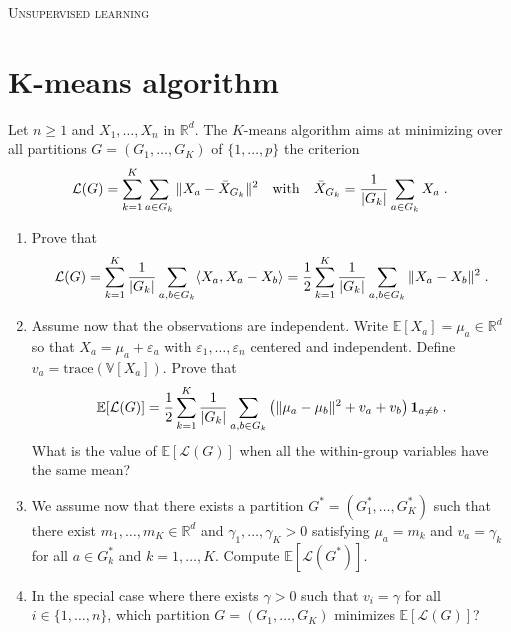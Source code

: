 \documentclass[a4paper,10pt,fleqn]{article}
\newcommand{\R}{\ensuremath{\mathbb{R}}}
\newcommand{\E}{\ensuremath{\mathbb{E}}}
\newcommand{\V}{\ensuremath{\mathbb{V}}}
\newcommand{\1}{\ensuremath{\mathbbm{1}}}
\newcommand{\eps}{\varepsilon}
\newcommand{\crit}{\mathcal{L}}
\begin{document}
\noindent\hrulefill

\begin{center}
\textsc{Unsupervised learning}
\end{center}
\hrulefill

\medskip


\section{K-means algorithm}
Let $n\geqslant 1$ and  $X_{1},\ldots,X_{n}$ in $\R^d$.
The $K$-means algorithm aims at minimizing over all partitions $G=(G_{1},\ldots,G_{K})$ of $\{1,\ldots,p\}$ the criterion
$$
\crit(G)=\sum_{k=1}^K\sum_{a\in G_{k}}\|X_{a}-\bar{X}_{G_{k}}\|^2\quad \textrm{with}\quad \bar{X}_{G_{k}}={1\over |G_{k}|}\sum_{a\in G_{k}} X_{a}\;.
$$
\begin{enumerate}
\item Prove that
$$
\crit(G)=\sum_{k=1}^K{1\over |G_{k}|}\sum_{a,b\in G_{k}} \langle X_{a},X_{a}-X_{b}\rangle ={1\over 2}\sum_{k=1}^K{1\over |G_{k}|}\sum_{a,b\in G_{k}} \|X_{a}-X_{b}\|^2\;.
$$
\item Assume now that the observations are independent. Write $\E[X_a] = \mu_{a}\in\R^d$ so that $X_{a}=\mu_{a}+\eps_{a}$ with $\eps_{1},\ldots,\eps_{n}$ centered and independent. Define $v_{a}=\textrm{trace}(\V[X_{a}])$. Prove that
$$
\E[\crit(G)]={1\over 2}\sum_{k=1}^K{1\over |G_{k}|}\sum_{a,b\in G_{k}} \left(\|\mu_{a}-\mu_{b}\|^2+v_{a}+v_{b}\right){\bf 1}_{a\neq b}\;.
$$
What is the value of $\E[\crit(G)]$ when all the within-group variables have the same mean?
\item We assume now that there exists a partition $G^*=(G^*_{1},\ldots,G^*_{K})$ such  that there exist $m_{1},\ldots,m_{K}\in\R^d$ and $\gamma_{1},\ldots,\gamma_{K}>0$ satisfying
$\mu_{a}=m_{k}$ and $v_{a}=\gamma_{k}$ for all $a\in G^*_{k}$ and $k=1,\ldots,K$. Compute $\E[\crit(G^*)]$.
\item In the special case where there exists $\gamma > 0$ such that $v_{i}=\gamma$ for all $i \in \{1,\ldots,n\}$, which partition $G=(G_{1},\ldots,G_{K})$ minimizes $\E[\crit(G)]$?
\end{enumerate}
	
\end{document}
